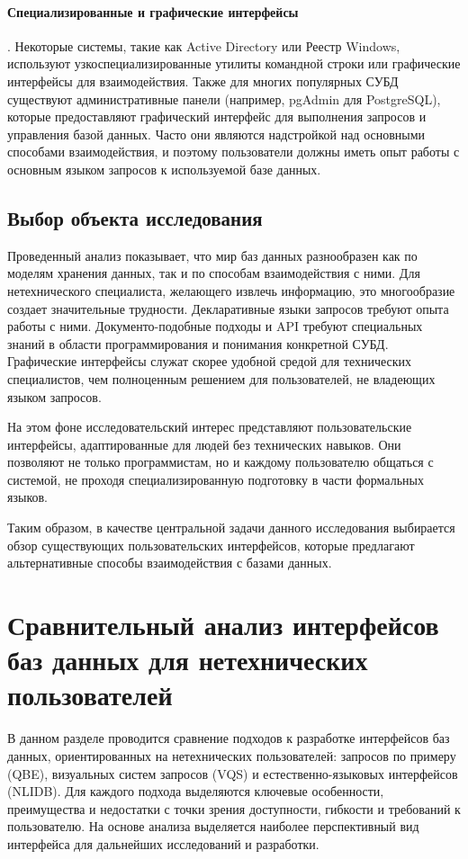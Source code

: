 \paragraph{Специализированные и графические интерфейсы}.
Некоторые системы, такие как Active Directory или Реестр Windows, используют узкоспециализированные
утилиты командной строки или графические интерфейсы для взаимодействия.
Также для многих популярных СУБД существуют административные панели
(например, pgAdmin для PostgreSQL), которые предоставляют графический интерфейс для
выполнения запросов и управления базой данных. Часто они являются надстройкой над основными способами взаимодействия,
и поэтому пользователи должны иметь опыт работы с основным языком запросов к используемой базе данных.




\subsection{Выбор объекта исследования}

Проведенный анализ показывает, что мир баз данных разнообразен как по моделям хранения данных,
так и по способам взаимодействия с ними. Для нетехнического специалиста, желающего извлечь информацию,
это многообразие создает значительные трудности.
Декларативные языки запросов требуют опыта работы с ними.
Документо-подобные подходы и API требуют специальных знаний в области программирования
и понимания конкретной СУБД. Графические интерфейсы служат скорее удобной средой для
технических специалистов, чем полноценным решением для пользователей, не владеющих
языком запросов.

На этом фоне исследовательский интерес представляют
пользовательские интерфейсы, адаптированные для людей без технических навыков. Они позволяют
не только программистам, но и каждому пользователю общаться с системой, не проходя специализированную
подготовку в части формальных языков.

Таким образом, в качестве центральной задачи данного исследования выбирается обзор существующих
пользовательских интерфейсов, которые предлагают альтернативные способы взаимодействия
с базами данных.




\section{Сравнительный анализ интерфейсов баз данных для нетехнических пользователей}
\begin{annotation}
	В данном разделе проводится сравнение подходов к разработке интерфейсов баз данных,
	ориентированных на нетехнических пользователей: запросов по примеру (QBE), визуальных систем запросов (VQS) и
	естественно-языковых интерфейсов (NLIDB).
	Для каждого подхода выделяются ключевые особенности,
	преимущества и недостатки с точки зрения доступности, гибкости и требований к пользователю.
	На основе анализа выделяется наиболее перспективный вид интерфейса для дальнейших исследований и разработки.
\end{annotation}




